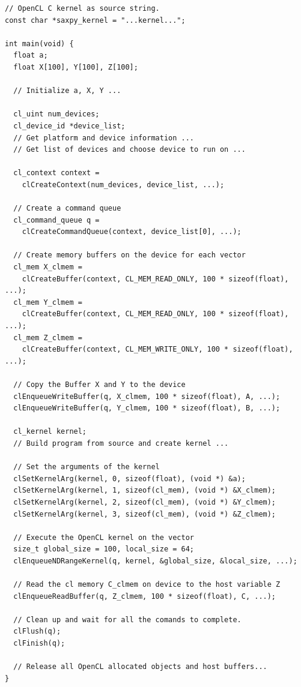 \begin{lstlisting}[style=CStyle, caption=OpenCL saxpy example (host), float, floatplacement=H, label={lst:opencl_host_saxpy}]
// OpenCL C kernel as source string.
const char *saxpy_kernel = "...kernel...";

int main(void) {
  float a;
  float X[100], Y[100], Z[100];

  // Initialize a, X, Y ...

  cl_uint num_devices;
  cl_device_id *device_list;
  // Get platform and device information ...
  // Get list of devices and choose device to run on ...

  cl_context context = 
    clCreateContext(num_devices, device_list, ...);

  // Create a command queue
  cl_command_queue q = 
    clCreateCommandQueue(context, device_list[0], ...);

  // Create memory buffers on the device for each vector
  cl_mem X_clmem = 
    clCreateBuffer(context, CL_MEM_READ_ONLY, 100 * sizeof(float), ...);
  cl_mem Y_clmem = 
    clCreateBuffer(context, CL_MEM_READ_ONLY, 100 * sizeof(float), ...);
  cl_mem Z_clmem = 
    clCreateBuffer(context, CL_MEM_WRITE_ONLY, 100 * sizeof(float), ...);

  // Copy the Buffer X and Y to the device
  clEnqueueWriteBuffer(q, X_clmem, 100 * sizeof(float), A, ...);
  clEnqueueWriteBuffer(q, Y_clmem, 100 * sizeof(float), B, ...);

  cl_kernel kernel;
  // Build program from source and create kernel ...

  // Set the arguments of the kernel
  clSetKernelArg(kernel, 0, sizeof(float), (void *) &a);
  clSetKernelArg(kernel, 1, sizeof(cl_mem), (void *) &X_clmem);
  clSetKernelArg(kernel, 2, sizeof(cl_mem), (void *) &Y_clmem);
  clSetKernelArg(kernel, 3, sizeof(cl_mem), (void *) &Z_clmem);

  // Execute the OpenCL kernel on the vector
  size_t global_size = 100, local_size = 64;
  clEnqueueNDRangeKernel(q, kernel, &global_size, &local_size, ...);

  // Read the cl memory C_clmem on device to the host variable Z
  clEnqueueReadBuffer(q, Z_clmem, 100 * sizeof(float), C, ...);

  // Clean up and wait for all the comands to complete.
  clFlush(q);
  clFinish(q);

  // Release all OpenCL allocated objects and host buffers...
}
\end{lstlisting}

